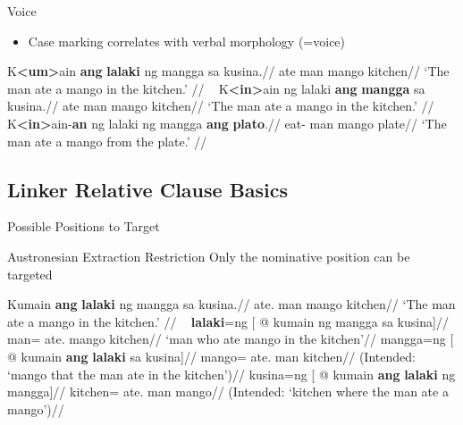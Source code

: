 \documentclass[pdf]{beamer}
\newcommand{\ix}[1]{{\footnotesize<}#1{\footnotesize>}}
\newcommand{\texthl}[1]{\textcolor{cyan!75!blue}{\textbf{#1}}}
\begin{document}
\begin{frame}{Voice}
  \begin{itemize}
    \item Case marking correlates with verbal morphology (=voice)
  \end{itemize}
  \ex\begingl
    \gla  K\texthl{\ix{um}}ain \texthl{ang} \texthl{lalaki} ng mangga sa kusina.//
    \glb  \ix{\Av}ate \Nom{} man \Gen{} mango \Obl{} kitchen//
    \glft `The man ate a mango in the kitchen.'
          //
  \endgl
  \xe
  \ex~\begingl
    \gla  K\texthl{\ix{in}}ain ng lalaki \texthl{ang} \texthl{mangga} sa kusina.//
    \glb  \ix{\Pv}ate \Gen{} man \Nom{} mango \Obl{} kitchen//
    \glft `The man ate a mango in the kitchen.'
          //
  \endgl
  \xe
  \ex~\begingl
    \gla  K\texthl{\ix{in}}ain-\texthl{an} ng lalaki ng mangga \texthl{ang} \texthl{plato}.//
    \glb  \ix{\Pfv}eat-\Lv{} \Gen{} man \Gen{} mango \Nom{} plate//
    \glft `The man ate a mango from the plate.'
          //
  \endgl
  \xe
\end{frame}


\subsection{Linker Relative Clause Basics}

\begin{frame}{Possible Positions to Target}
  \begin{alertblock}{Austronesian Extraction Restriction}
    Only the nominative position can be targeted
  \end{alertblock}
  \ex\begingl
    \gla  Kumain \texthl{ang} \texthl{lalaki} ng mangga sa kusina.//
    \glb  ate.\Av{} \Nom{} man \Gen{} mango \Obl{} kitchen//
    \glft `The man ate a mango in the kitchen.'
          //
  \endgl
  \xe\vspace{-1em}\pause
  \pex~
  \a\begingl
    \gla  \texthl{lalaki}=ng [ @ kumain ng mangga sa kusina]//
    \glb  man=\Lk{} ate.\Av{} \Gen{} mango \Obl{} kitchen//
    \glft `man who ate mango in the kitchen'//
  \endgl
  \a\ljudge{*}\begingl
    \gla  mangga=ng [ @ kumain \texthl{ang} \texthl{lalaki} sa kusina]//
    \glb  mango=\Lk{} ate.\Av{} \Nom{} man \Obl{} kitchen//
    \glft (Intended: `mango that the man ate in the kitchen')//
  \endgl
  \a\ljudge{*}\begingl
    \gla  kusina=ng [ @ kumain \texthl{ang} \texthl{lalaki} ng mangga]//
    \glb  kitchen=\Lk{} ate.\Av{} \Nom{} man \Gen{} mango//
    \glft (Intended: `kitchen where the man ate a mango')//
  \endgl
  \xe
\end{frame}
\end{document}
